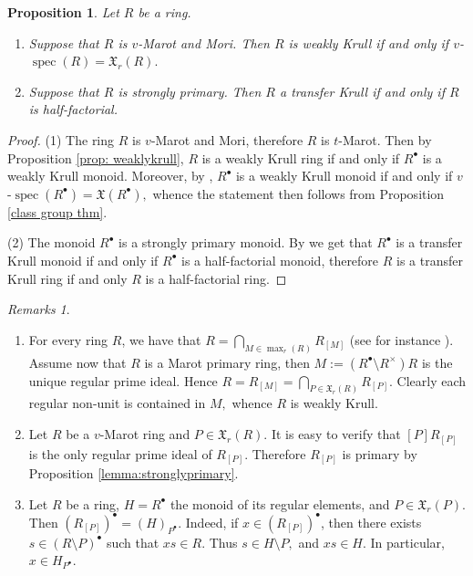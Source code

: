 \documentclass[a4paper, 10pt]{amsart}
\theoremstyle{plain}
\newtheorem{proposition}[theorem]{Proposition}
\theoremstyle{definition}
\theoremstyle{remark}
\newtheorem{remarks}[theorem]{Remarks}
\DeclareMathOperator{\spec}{spec}
\numberwithin{equation}{section}
\begin{document}
\begin{proposition}
    Let $R$ be a ring. 
    \begin{enumerate}[label=\textup(\normalfont\arabic*\textup)]
        \item Suppose that $R$ is $v$-Marot and Mori. Then $R$ is weakly Krull if and only if $v$-$\spec(R)=\mathfrak{X}_r(R).$
        \item Suppose that $R$ is strongly primary. Then $R$ a transfer Krull if and only if $R$ is half-factorial.
    \end{enumerate} 
\end{proposition}
\begin{proof} (1)  The ring $R$ is $v$-Marot and Mori, therefore $R$ is $t$-Marot. Then by Proposition \ref{prop: weaklykrull}, $R$ is a weakly Krull ring if and only if $R^\bullet$ is a weakly Krull monoid. Moreover, by \cite[Theorem 24.5]{HK98}, $R^\bullet$ is a weakly Krull monoid if and only if $v$-$\spec(R^\bullet)=\mathfrak{X}(R^\bullet),$ whence the statement then follows from Proposition \ref{class group thm}.

    (2) The monoid $R^{\bullet}$ is a strongly primary monoid. By \cite[Theorem 5.5]{GSZ17} we get that $R^\bullet$ is a transfer Krull monoid if and only if $R^\bullet$ is a half-factorial monoid, therefore $R$ is a transfer Krull ring if and only $R$ is a half-factorial ring.
\end{proof}

\begin{remarks}\label{remarks}
\begin{enumerate}
    \item  For every ring $R$, we have that $R=\bigcap_{M\in \max_r(R)}R_{[M]}$ (see for instance \cite[Theorem 6.1]{Hu88}). Assume now that $R$ is a Marot primary ring, then $M:=(R^\bullet\setminus R^\times)R$ is the unique regular prime ideal. Hence $R=R_{[M]}=\bigcap_{P\in \mathfrak{X}_r(R)}R_{[P]}.$ Clearly each regular non-unit is contained in $M,$ whence $R$ is weakly Krull. 
    \item Let $R$ be a $v$-Marot ring and $P\in \mathfrak{X}_r(R).$ It is easy to verify that $[P]R_{[P]}$ is the only regular prime ideal of $R_{[P]}$. Therefore $R_{[P]}$ is primary by Proposition \ref{lemma:stronglyprimary}.
    \item Let $R$ be a ring, $H=R^\bullet$ the monoid of its regular elements, and $P\in \mathfrak{X}_r(P).$ Then $(R_{[P]})^\bullet= (H)_{P^\bullet}.$ Indeed, if $x\in (R_{[P]})^\bullet$, then there exists $s\in (R\setminus P)^\bullet$ such that $xs\in R.$ Thus $s\in H \setminus P,$ and $xs\in H.$ In particular, $x\in H_{P^\bullet}.$
\end{enumerate}
\end{remarks}
\end{document}
